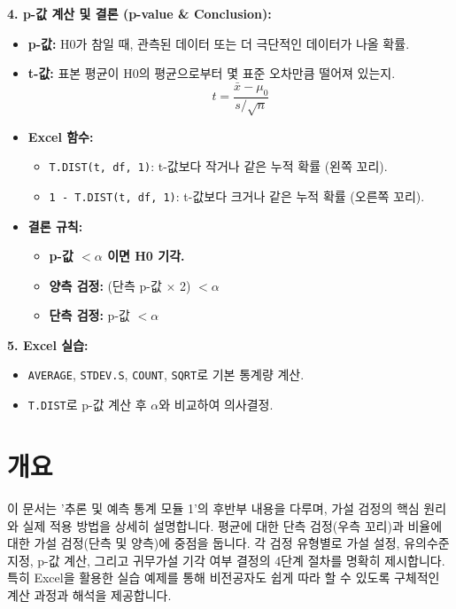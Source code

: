 \documentclass[11pt,a4paper]{book}
\theoremstyle{definition}
\begin{document}
\begin{tcolorbox}[colback=lightblue, colframe=darkblue, title={\textbf{모듈 1 핵심 요약: 가설 검정의 기초}}]
\textbf{4. p-값 계산 및 결론 (p-value \& Conclusion):}
\begin{itemize}
    \item \textbf{p-값:} H0가 참일 때, 관측된 데이터 또는 더 극단적인 데이터가 나올 확률.
    \item \textbf{t-값:} 표본 평균이 H0의 평균으로부터 몇 표준 오차만큼 떨어져 있는지.
        \[ t = \frac{\bar{x} - \mu_0}{s / \sqrt{n}} \]
    \item \textbf{Excel 함수:}
        \begin{itemize}
            \item \texttt{T.DIST(t, df, 1)}: t-값보다 작거나 같은 누적 확률 (왼쪽 꼬리).
            \item \texttt{1 - T.DIST(t, df, 1)}: t-값보다 크거나 같은 누적 확률 (오른쪽 꼬리).
        \end{itemize}
    \item \textbf{결론 규칙:}
        \begin{itemize}
            \item \textbf{p-값 $< \alpha$ 이면 H0 기각.}
            \item \textbf{양측 검정:} (단측 p-값 $\times$ 2) $< \alpha$
            \item \textbf{단측 검정:} p-값 $< \alpha$
        \end{itemize}
\end{itemize}

\textbf{5. Excel 실습:}
\begin{itemize}
    \item \texttt{AVERAGE}, \texttt{STDEV.S}, \texttt{COUNT}, \texttt{SQRT}로 기본 통계량 계산.
    \item \texttt{T.DIST}로 p-값 계산 후 $\alpha$와 비교하여 의사결정.
\end{itemize}
\end{tcolorbox}


\section*{개요}
이 문서는 '추론 및 예측 통계 모듈 1'의 후반부 내용을 다루며, 가설 검정의 핵심 원리와 실제 적용 방법을 상세히 설명합니다. 평균에 대한 단측 검정(우측 꼬리)과 비율에 대한 가설 검정(단측 및 양측)에 중점을 둡니다. 각 검정 유형별로 가설 설정, 유의수준 지정, p-값 계산, 그리고 귀무가설 기각 여부 결정의 4단계 절차를 명확히 제시합니다. 특히 Excel을 활용한 실습 예제를 통해 비전공자도 쉽게 따라 할 수 있도록 구체적인 계산 과정과 해석을 제공합니다.
\end{document}
